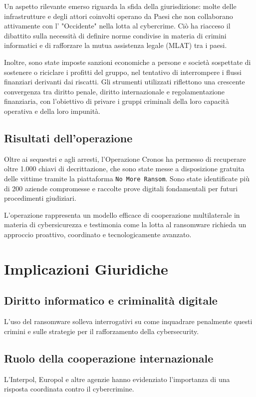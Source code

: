 \documentclass[a4paper,12pt]{article}
\begin{document}
Un aspetto rilevante emerso riguarda la sfida della giurisdizione: molte delle infrastrutture e degli attori coinvolti operano da Paesi che non collaborano attivamente con l’ "Occidente" nella lotta al cybercrime. Ciò ha riacceso il dibattito sulla necessità di definire norme condivise in materia di crimini informatici e di rafforzare la mutua assistenza legale (MLAT) tra i paesi.

Inoltre, sono state imposte sanzioni economiche a persone e società sospettate di sostenere o riciclare i profitti del gruppo, nel tentativo di interrompere i flussi finanziari derivanti dai riscatti. Gli strumenti utilizzati riflettono una crescente convergenza tra diritto penale, diritto internazionale e regolamentazione finanziaria, con l’obiettivo di privare i gruppi criminali della loro capacità operativa e della loro impunità.

\subsection{Risultati dell'operazione}
Oltre ai sequestri e agli arresti, l’Operazione Cronos ha permesso di recuperare oltre 1.000 chiavi di decrittazione, che sono state messe a disposizione gratuita delle vittime tramite la piattaforma \texttt{No More Ransom}. Sono state identificate più di 200 aziende compromesse e raccolte prove digitali fondamentali per futuri procedimenti giudiziari.

L’operazione rappresenta un modello efficace di cooperazione multilaterale in materia di cybersicurezza e testimonia come la lotta al ransomware richieda un approccio proattivo, coordinato e tecnologicamente avanzato.

\section{Implicazioni Giuridiche}
\subsection{Diritto informatico e criminalità digitale}
L'uso del ransomware solleva interrogativi su come inquadrare penalmente questi crimini e sulle strategie per il rafforzamento della cybersecurity.

\subsection{Ruolo della cooperazione internazionale}
L'Interpol, Europol e altre agenzie hanno evidenziato l'importanza di una risposta coordinata contro il cybercrimine.
\end{document}

